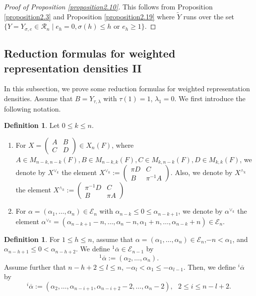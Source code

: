 \documentclass[11pt,oneside]{amsart}
\theoremstyle{plain}
\theoremstyle{definition}
\newtheorem{definition}[theorem]{Definition}
\theoremstyle{remark}
\newcommand{\tx}[1]{\text{#1}}
\newcommand{\CE}{{\mathcal E}}
\newcommand{\CR}{{\mathcal R}}
\newcommand{\C}{\mathbb{C}}
\numberwithin{equation}{section}
\begin{document}
	\begin{proof}[Proof of Proposition \ref{proposition2.10}]
		This follows from Proposition \ref{proposition2.3} and Proposition \ref{proposition2.19} where $\widetilde{Y}$ runs over the set $\lbrace Y=Y_{\sigma,e}\in \CR_n \mid e_h=0, \sigma(h)\leq h \text{ or } e_h \geq 1 \rbrace$.
	\end{proof}
	\subsection{Reduction formulas for weighted representation densities II}\label{subsection2.3}
	In this subsection, we prove some reduction formulas for weighted representation densities. Assume that $B=Y_{\tau, \lambda}$ with $\tau(1)=1$, $\lambda_1=0$. We first introduce the following notation.
	
	\begin{definition}\label{definition2.20} Let $0 \leq k \leq n$.
		\begin{enumerate}
			\item For $X=\left( \begin{array}{cc} A & B \\C & D \end{array}\right) \in X_n(F)$, where $A \in M_{n-k,n-k}(F), B \in M_{n-k,k}(F), C \in M_{k,n-k}(F), D \in M_{k,k}(F)$, we denote by $X^{\vee_k}$ the element $X^{\vee_k}:=\left( \begin{array}{cc} \pi D & C \\B & \pi^{-1}A \end{array}\right)$. Also, we denote by $X^{\wedge_k}$ the element $X^{\wedge_k}:=\left( \begin{array}{cc} \pi^{-1} D & C \\B & \pi A \end{array}\right)$
			\item For $\alpha=(\alpha_1,\dots,\alpha_n) \in \CE_n$ with $\alpha_{n-k} \leq 0 \leq \alpha_{n-k+1}$, we denote by $\alpha^{\vee_k}$ the element $\alpha^{\vee_k}=(\alpha_{n-k+1}-n,\dots,\alpha_n-n,\alpha_1+n,\dots,\alpha_{n-k}+n)\in \CE_n$.
		\end{enumerate}
	\end{definition}
	
	\begin{definition}\label{definition2.21}
		For $1 \leq h \leq n$, assume that $\alpha=(\alpha_1,\dots,\alpha_n) \in \CE_n$,$-n<\alpha_1$, and $\alpha_{n-h+1}\leq 0<\alpha_{n-h+2}$. We define $^1\overline{\alpha} \in \CE_{n-1}$ by
		\begin{equation*}
			^1\overline{\alpha}:=(\alpha_2,\dots,\alpha_n).
		\end{equation*}
		Assume further that $n-h+2 \leq l \leq n$, $-\alpha_{l}<\alpha_1 \leq -\alpha_{l-1}$. Then, we define $^i\overline{\alpha}$ by
		\begin{equation*}
			^i\overline{\alpha}:=(\alpha_2,\dots,\alpha_{n-i+1},\alpha_{n-i+2}-2,\dots,\alpha_n-2), \tx{ }2 \leq i \leq n-l+2.
		\end{equation*}
	\end{definition}
	
\end{document}
